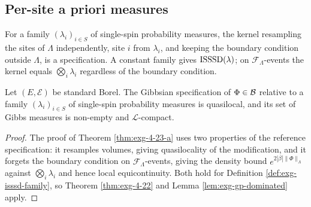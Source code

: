 \subsection*{Per-site a priori measures}

\begin{definition}
    \label{def:exg-isssd-family}
    \leanok

    For a family $(\lambda_i)_{i\in S}$ of single-spin probability measures, the kernel
    resampling the sites of $\Lambda$ independently, site $i$ from $\lambda_i$, and keeping
    the boundary condition outside $\Lambda$, is a specification. A constant family gives
    $\operatorname{ISSSD}(\lambda)$; on $\mathcal F_\Lambda$-events the kernel equals
    $\bigotimes_i\lambda_i$ regardless of the boundary condition.
\end{definition}

\begin{theorem}
    \label{thm:exg-4-23-a-family}
    \leanok

    Let $(E,\mathcal E)$ be standard Borel. The Gibbsian specification of $\Phi\in\mathcal{B}$
    relative to a family $(\lambda_i)_{i\in S}$ of single-spin probability measures is
    quasilocal, and its set of Gibbs measures is non-empty and $\mathcal L$-compact.
\end{theorem}
\begin{proof}
    \leanok

    The proof of Theorem \ref{thm:exg-4-23-a} uses two properties of the reference
    specification: it resamples volumes, giving quasilocality of the modification, and it
    forgets the boundary condition on $\mathcal F_\Lambda$-events, giving the density bound
    $e^{2|\beta|\|\Phi\|_\Lambda}$ against $\bigotimes_i\lambda_i$ and hence local
    equicontinuity. Both hold for Definition \ref{def:exg-isssd-family}, so
    Theorem \ref{thm:exg-4-22} and Lemma \ref{lem:exg-gp-dominated} apply.
\end{proof}

